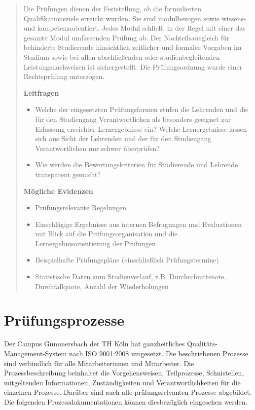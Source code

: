 \begin{quote}
Die Prüfungen dienen der Feststellung, ob die formulierten
Qualifikationsziele erreicht wurden. Sie sind modulbezogen sowie
wissens- und kompetenzorientiert. Jedes Modul schließt in der Regel mit
einer das gesamte Modul umfassenden Prüfung ab. Der Nachteilsausgleich
für behinderte Studierende hinsichtlich zeitlicher und formaler Vorgaben
im Studium sowie bei allen abschließenden oder studienbegleitenden
Leistungsnachweisen ist sichergestellt. Die Prüfungsordnung wurde einer
Rechtsprüfung unterzogen.

\textbf{Leitfragen}

\begin{itemize}
\item
  Welche der eingesetzten Prüfungsformen stufen die Lehrenden und die
  für den Studiengang Verantwortlichen als besonders geeignet zur
  Erfassung erreichter Lernergebnisse ein? Welche Lernergebnisse lassen
  sich aus Sicht der Lehrenden und der für den Studiengang
  Verantwortlichen nur schwer überprüfen?
\item
  Wie werden die Bewertungskriterien für Studierende und Lehrende
  transparent gemacht?
\end{itemize}

\textbf{Mögliche Evidenzen}

\begin{itemize}
\item
  Prüfungsrelevante Regelungen
\item
  Einschlägige Ergebnisse aus internen Befragungen und Evaluationen mit
  Blick auf die Prüfungsorganisation und die Lernergebnisorientierung
  der Prüfungen
\item
  Beispielhafte Prüfungspläne (einschließlich Prüfungstermine)
\item
  Statistische Daten zum Studienverlauf, z.B. Durchschnittsnote,
  Durchfallquote, Anzahl der Wiederholungen
\end{itemize}
\end{quote}

\section{Prüfungsprozesse}\label{pruxfcfungsprozesse}

Der Campus Gummersbach der TH Köln hat ganzheitliches
Qualitäts-Management-System nach ISO 9001:2008 umgesetzt. Die
beschriebenen Prozesse sind verbindlich für alle Mitarbeiterinnen und
Mitarbeiter. Die Prozessbeschreibung beinhaltet die Vorgehensweisen,
Teilprozesse, Schnistellen, mitgeltenden Informationen, Zuständigkeiten
und Verantwortlichkeiten für die einzelnen Prozesse. Darüber sind auch
alle prüfungsrelvanten Prozesse abgebildet. Die folgenden
Prozessdokumentationen können diesbezüglich eingesehen werden.


